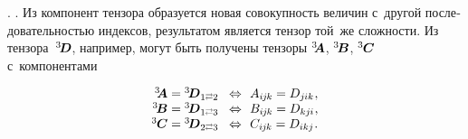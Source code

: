 \begin{otherlanguage}{russian}


   .
   .
Из компонент тензора образуется новая совокупность величин с~другой последовательностью индексов, результатом является тензор той~же сложности.
Из тензора~${^3\hspace{-0.16em}\bm{D}}$, например, могут быть получены тензоры ${^3\hspace{-0.28em}\bm{A}}$, ${^3\hspace{-0.15em}\bm{B}}$, ${^3\hspace{-0.05em}\bm{C}}$ с~компонентами

\nopagebreak\vspace{-0.16em}\begin{equation}\label{action:4}
\begin{array}{rcl}
{^3\hspace{-0.28em}\bm{A}} = {^3\hspace{-0.16em}\bm{D}}_{1 \scalebox{0.6}[0.8]{$\rightleftarrows$} 2}
& \!\Leftrightarrow\!\! &
A_{i\hspace{-0.1ex}j\hspace{-0.1ex}k} = D_{j\hspace{-0.06ex}ik} \hspace{.1ex},
\\
{^3\hspace{-0.15em}\bm{B}} = {^3\hspace{-0.16em}\bm{D}}_{1 \scalebox{0.6}[0.8]{$\rightleftarrows$} 3}
& \!\Leftrightarrow\!\! & B_{i\hspace{-0.1ex}j\hspace{-0.1ex}k} = D_{kj\hspace{-0.06ex}i} \hspace{.1ex},
\\
{^3\hspace{-0.05em}\bm{C}} = {^3\hspace{-0.16em}\bm{D}}_{2 \scalebox{0.6}[0.8]{$\rightleftarrows$} 3}
& \!\Leftrightarrow\!\! & C_{i\hspace{-0.1ex}j\hspace{-0.1ex}k} = D_{ikj} \hspace{.1ex}.
\end{array}
\end{equation}


\end{otherlanguage}
